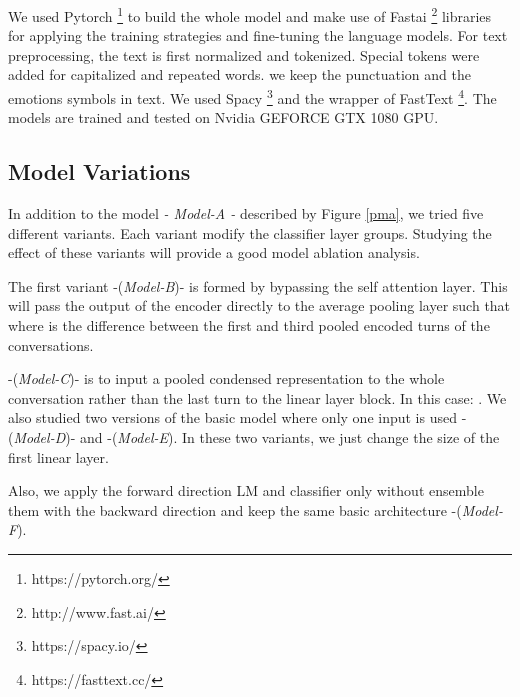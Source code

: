 \documentclass{article}
\begin{document}
 We used Pytorch \footnote{https://pytorch.org/} to build the whole model and make use of Fastai  \footnote{http://www.fast.ai/} libraries for applying the training strategies and fine-tuning the language models. For text preprocessing, the text is first normalized and tokenized. Special tokens were added for capitalized and repeated words. we keep the punctuation and the emotions symbols in text. We used Spacy \footnote{https://spacy.io/} and the wrapper of FastText \footnote{https://fasttext.cc/}. The models are trained and tested on Nvidia GEFORCE GTX 1080 GPU. 


\subsection{Model Variations}
In addition to the model  \textit{- Model-A -}   described by Figure \ref{pma}, we tried five different variants. Each variant modify the classifier layer groups. Studying the effect of these variants will provide a good model ablation analysis. 


The first variant -(\textit{Model-B})- is formed by bypassing the self attention layer. This will pass the output of the encoder directly to the average pooling layer such that  where  is the difference between the first and third pooled encoded turns of the conversations. 

-(\textit{Model-C})- is to input a pooled condensed representation to the whole conversation  rather than the last turn to the linear layer block. In this case: .
We also studied two versions of the basic model where only one input is used  -(\textit{Model-D})- and  -(\textit{Model-E}).
In these two variants, we just change the size of the first linear layer. 

Also, we apply the forward direction LM and classifier only without ensemble them with the backward direction and keep the same basic architecture -(\textit{Model-F}). 
\end{document}
